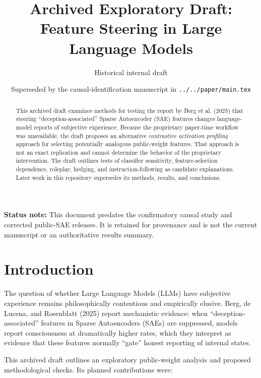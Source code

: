 \documentclass[11pt]{article}
\title{Archived Exploratory Draft: Feature Steering in Large Language Models}
\author{
  Historical internal draft
}
\date{Superseded by the causal-identification manuscript in \texttt{../../paper/main.tex}}
\begin{document}
\maketitle

\begin{center}
\textbf{Status note:} This document predates the confirmatory causal study and
corrected public-SAE releases. It is retained for provenance and is not the
current manuscript or an authoritative results summary.
\end{center}

\begin{abstract}
This archived draft examines methods for testing the report by Berg et al. (2025) that steering ``deception-associated'' Sparse Autoencoder (SAE) features changes language-model reports of subjective experience. Because the proprietary paper-time workflow was unavailable, the draft proposes an alternative \emph{contrastive activation profiling} approach for selecting potentially analogous public-weight features. That approach is not an exact replication and cannot determine the behavior of the proprietary intervention. The draft outlines tests of classifier sensitivity, feature-selection dependence, roleplay, hedging, and instruction-following as candidate explanations. Later work in this repository supersedes its methods, results, and conclusions.
\end{abstract}

\tableofcontents
\newpage

\section{Introduction}

The question of whether Large Language Models (LLMs) have subjective experience remains philosophically contentious and empirically elusive. Berg, de Lucena, and Rosenblatt (2025) report mechanistic evidence: when ``deception-associated'' features in Sparse Autoencoders (SAEs) are suppressed, models report consciousness at dramatically higher rates, which they interpret as evidence that these features normally ``gate'' honest reporting of internal states.

This archived draft outlines an exploratory public-weight analysis and proposed methodological checks. Its planned contributions were:
\end{document}
